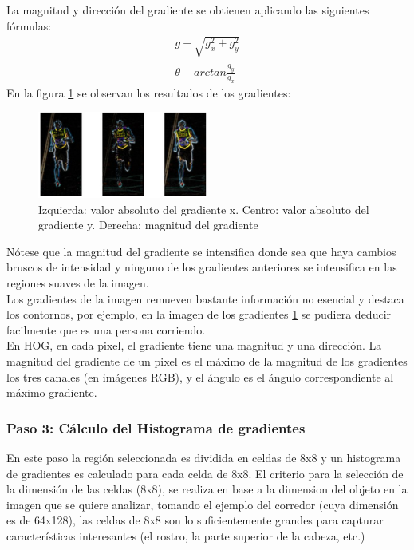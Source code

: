   La magnitud y dirección del gradiente se obtienen aplicando las siguientes fórmulas:
  	\begin{eqnarray}
	  	g-\sqrt{g^2_x+g^2_y} \\
	  	\theta-arctan\frac{g_y}{g_x}
  	\end{eqnarray}
 En la figura \ref{fig: hogFilter} se observan los resultados de los gradientes:
  \begin{figure}[htbp]
  	\centering
  	\includegraphics[width=0.5\textwidth]{./pictures/hogGradients}
  	\caption{Izquierda:  valor absoluto del gradiente x. Centro: valor absoluto del gradiente y. Derecha: magnitud del gradiente}\label{fig: hogFilter}
  \end{figure}  
  Nótese que la magnitud del gradiente se intensifica donde sea que haya cambios bruscos de intensidad y ninguno de los gradientes anteriores se intensifica en las regiones suaves de la imagen.\\
  Los gradientes de la imagen remueven bastante información no esencial y destaca los contornos, por ejemplo, en la imagen de los gradientes \ref{fig: hogFilter} se pudiera deducir facilmente que es una persona corriendo.\\
  En HOG, en cada pixel, el gradiente tiene una magnitud y una dirección. La magnitud del gradiente de un pixel es el máximo de la magnitud de los gradientes los tres canales (en imágenes RGB), y el ángulo es el ángulo correspondiente al máximo gradiente.
   
   \subsubsection{Paso 3: Cálculo del Histograma de gradientes}
   En este paso la región seleccionada es dividida en celdas de 8x8 y un histograma de gradientes es calculado para cada celda de 8x8. El criterio para la selección de la dimensión de las celdas (8x8), se realiza en base a la dimension del objeto en la imagen que se quiere analizar, tomando el ejemplo del corredor (cuya dimensión es de 64x128), las celdas de 8x8 son lo suficientemente grandes para capturar características interesantes (el rostro, la parte superior de la cabeza, etc.)
   
